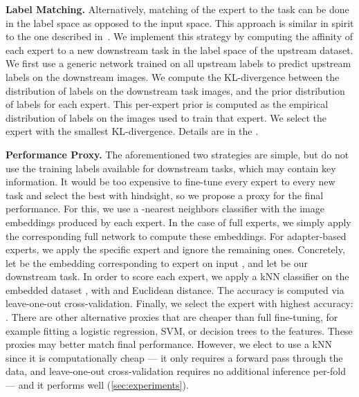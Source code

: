 \documentclass{article}
\begin{document}
\textbf{Label Matching.}
Alternatively, matching of the expert to the task can be done in the label space as opposed to the input space.
This approach is similar in spirit to the one described in~\cite{ngiam2018domain}.
We implement this strategy by computing the affinity of each expert to a new downstream task in the label space of the upstream dataset.
We first use a generic network trained on all upstream labels to predict upstream labels on the downstream images.
We compute the KL-divergence between the distribution of labels on the downstream task images, and the prior distribution of labels for each expert.
This per-expert prior is computed as the empirical distribution of labels on the images used to train that expert.
We select the expert with the smallest KL-divergence.
Details are in the .

\textbf{Performance Proxy.}
The aforementioned two strategies are simple, but do not use the training labels  available for downstream tasks, which may contain key information.
It would be too expensive to fine-tune every expert to every new task and select the best with hindsight, so we propose a proxy for the final performance.
For this, we use a -nearest neighbors classifier \cite{altman1992introduction} with the image embeddings produced by each expert.
In the case of full experts, we simply apply the corresponding full network to compute these embeddings.
For adapter-based experts, we apply the specific expert and ignore the remaining ones.
Concretely, let  be the embedding corresponding to expert  on input , and let  be our downstream task.
In order to score each expert, we apply a kNN classifier on the embedded dataset , with  and Euclidean distance.
The accuracy  is computed via leave-one-out cross-validation.
Finally, we select the expert with highest accuracy: .
There are other alternative proxies that are cheaper than full fine-tuning, for example fitting a logistic regression, SVM, or decision trees to the features.
These proxies may better match final performance.
However, we elect to use a kNN since it is computationally cheap ---
it only requires a forward pass through the data, and leave-one-out cross-validation requires no additional inference per-fold ---  and it performs well (\cref{sec:experiments}).
\end{document}

